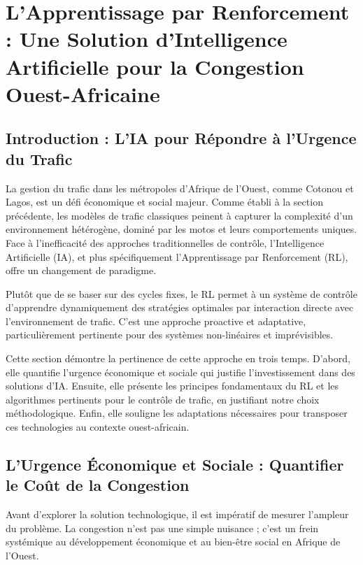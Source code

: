\section{L'Apprentissage par Renforcement : Une Solution d'Intelligence Artificielle pour la Congestion Ouest-Africaine}
\label{sec:rl_pour_afrique_ouest}

\subsection{Introduction : L'IA pour Répondre à l'Urgence du Trafic}
\label{subsec:rl_intro_unifie}

La gestion du trafic dans les métropoles d'Afrique de l'Ouest, comme Cotonou et Lagos, est un défi économique et social majeur. Comme établi à la section précédente, les modèles de trafic classiques peinent à capturer la complexité d'un environnement hétérogène, dominé par les motos et leurs comportements uniques. Face à l'inefficacité des approches traditionnelles de contrôle, l'Intelligence Artificielle (IA), et plus spécifiquement l'Apprentissage par Renforcement (RL), offre un changement de paradigme.

Plutôt que de se baser sur des cycles fixes, le RL permet à un système de contrôle d'apprendre dynamiquement des stratégies optimales par interaction directe avec l'environnement de trafic. C'est une approche proactive et adaptative, particulièrement pertinente pour des systèmes non-linéaires et imprévisibles.

Cette section démontre la pertinence de cette approche en trois temps. D'abord, elle quantifie l'urgence économique et sociale qui justifie l'investissement dans des solutions d'IA. Ensuite, elle présente les principes fondamentaux du RL et les algorithmes pertinents pour le contrôle de trafic, en justifiant notre choix méthodologique. Enfin, elle souligne les adaptations nécessaires pour transposer ces technologies au contexte ouest-africain.

\subsection{L'Urgence Économique et Sociale : Quantifier le Coût de la Congestion}
\label{subsec:urgence_economique_unifie}

Avant d'explorer la solution technologique, il est impératif de mesurer l'ampleur du problème. La congestion n'est pas une simple nuisance ; c'est un frein systémique au développement économique et au bien-être social en Afrique de l'Ouest.

